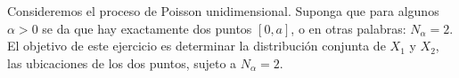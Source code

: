 \question

	Consideremos el proceso de Poisson unidimensional. Suponga que para algunos $\alpha>0$ se da que hay exactamente dos puntos $\left[0,a\right]$, o en otras palabras: $N_\alpha=2$. El objetivo de este ejercicio es determinar la distribución conjunta de $X_1$ y $X_2$, las ubicaciones de los dos puntos, sujeto a $N_\alpha=2$.


	\begin{solutionordottedlines}
		
	\end{solutionordottedlines}